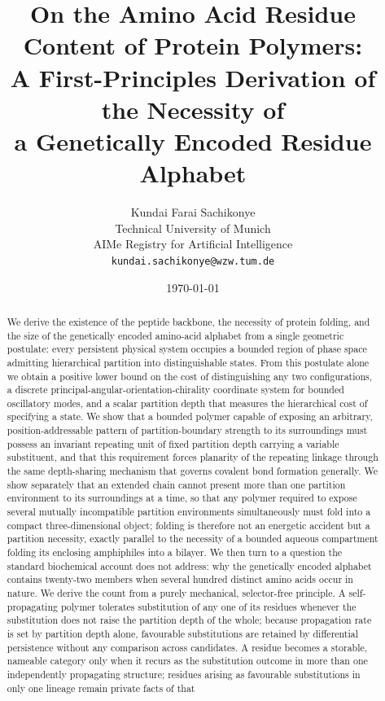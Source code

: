 \documentclass[11pt,twocolumn,a4paper]{article}
\title{\textbf{On the Amino Acid Residue Content of Protein Polymers:\\
A First-Principles Derivation of the Necessity of \\
a Genetically Encoded Residue Alphabet}}
\author{Kundai Farai Sachikonye\\
\small Technical University of Munich\\
\small AIMe Registry for Artificial Intelligence\\
\small \texttt{kundai.sachikonye@wzw.tum.de}}
\date{\today}
\theoremstyle{plain}
\theoremstyle{definition}
\theoremstyle{remark}
\begin{document}
\maketitle

\begin{abstract}
\noindent
We derive the existence of the peptide backbone, the necessity of protein
folding, and the size of the genetically encoded amino-acid alphabet from a
single geometric postulate: every persistent physical system occupies a
bounded region of phase space admitting hierarchical partition into
distinguishable states. From this postulate alone we obtain a positive lower
bound on the cost of distinguishing any two configurations, a discrete
principal-angular-orientation-chirality coordinate system for bounded
oscillatory modes, and a scalar partition depth that measures the
hierarchical cost of specifying a state. We show that a bounded polymer
capable of exposing an arbitrary, position-addressable pattern of
partition-boundary strength to its surroundings must possess an invariant
repeating unit of fixed partition depth carrying a variable substituent, and
that this requirement forces planarity of the repeating linkage through the
same depth-sharing mechanism that governs covalent bond formation generally.
We show separately that an extended chain cannot present more than one
partition environment to its surroundings at a time, so that any
polymer required to expose several mutually incompatible partition
environments simultaneously must fold into a compact three-dimensional
object; folding is therefore not an energetic accident but a partition
necessity, exactly parallel to the necessity of a bounded aqueous compartment
folding its enclosing amphiphiles into a bilayer. We then turn to a question
the standard biochemical account does not address: why the genetically
encoded alphabet contains twenty-two members when several hundred distinct
amino acids occur in nature. We derive the count from a purely mechanical,
selector-free principle. A self-propagating polymer tolerates
substitution of any one of its residues whenever the substitution does not
raise the partition depth of the whole; because propagation rate is set by
partition depth alone, favourable substitutions are retained by differential
persistence without any comparison across candidates. A residue becomes a
storable, nameable category only when it recurs as the substitution outcome
in more than one independently propagating structure; residues arising as
favourable substitutions in only one lineage remain private facts of that

\end{abstract}
\end{document}
